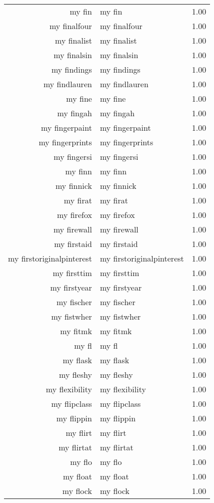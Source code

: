 \begin{table}[ht]
\begin{tabular}{rlr}
  my fin & my fin & 1.00 \\ 
  my finalfour & my finalfour & 1.00 \\ 
  my finalist & my finalist & 1.00 \\ 
  my finalsin & my finalsin & 1.00 \\ 
  my findings & my findings & 1.00 \\ 
  my findlauren & my findlauren & 1.00 \\ 
  my fine & my fine & 1.00 \\ 
  my fingah & my fingah & 1.00 \\ 
  my fingerpaint & my fingerpaint & 1.00 \\ 
  my fingerprints & my fingerprints & 1.00 \\ 
  my fingersi & my fingersi & 1.00 \\ 
  my finn & my finn & 1.00 \\ 
  my finnick & my finnick & 1.00 \\ 
  my firat & my firat & 1.00 \\ 
  my firefox & my firefox & 1.00 \\ 
  my firewall & my firewall & 1.00 \\ 
  my firstaid & my firstaid & 1.00 \\ 
  my firstoriginalpinterest & my firstoriginalpinterest & 1.00 \\ 
  my firsttim & my firsttim & 1.00 \\ 
  my firstyear & my firstyear & 1.00 \\ 
  my fischer & my fischer & 1.00 \\ 
  my fistwher & my fistwher & 1.00 \\ 
  my fitmk & my fitmk & 1.00 \\ 
  my fl & my fl & 1.00 \\ 
  my flask & my flask & 1.00 \\ 
  my fleshy & my fleshy & 1.00 \\ 
  my flexibility & my flexibility & 1.00 \\ 
  my flipclass & my flipclass & 1.00 \\ 
  my flippin & my flippin & 1.00 \\ 
  my flirt & my flirt & 1.00 \\ 
  my flirtat & my flirtat & 1.00 \\ 
  my flo & my flo & 1.00 \\ 
  my float & my float & 1.00 \\ 
  my flock & my flock & 1.00 \\ 

\end{tabular}
\end{table}
